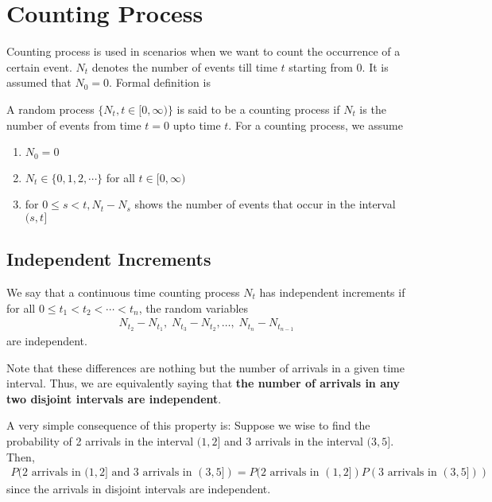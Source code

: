 \documentclass[../../probability-notes.tex]{subfiles}
\begin{document}
    \section{Counting Process}
    Counting process is used in scenarios when we want to count the occurrence of a certain event. $N_{t}$ denotes the number of events till time $t$ starting from 0. It is assumed that $N_{0} = 0$. Formal definition is\newline

    A random process $\{N_{t}, t \in [0, \infty)\}$ is said to be a counting process if $N_{t}$ is the number of events from time $t=0$ upto time $t$. For a counting process, we assume
    \begin{enumerate}
        \item $N_{0} = 0$
        \item $N_{t} \in \{0, 1, 2, \cdots\}$ for all $t \in [0, \infty)$
        \item for $0 \leq s < t, N_{t} - N_{s} $ shows the number of events that occur in the interval $(s,t]$
    \end{enumerate}

    \subsection{Independent Increments}
    We say that a continuous time counting process $N_{t}$ has independent increments if for all $0 \leq t_{1} < t_{2} < \cdots < t_{n}$, the random variables
    \begin{align*}
         N_{t_{2}} - N_{t_{1}}, \;N_{t_{3}} - N_{t_{2}}, \ldots, \;N_{t_{n}} - N_{t_{n-1}}
    \end{align*}
    are independent.\newline

    Note that these differences are nothing but the number of arrivals in a given time interval. Thus, we are equivalently saying that \textbf{the number of arrivals in any two disjoint intervals are independent}.\newline

    A very simple consequence of this property is:\newline
    Suppose we wise to find the probability of 2 arrivals in the interval $(1,2]$ and 3 arrivals in the interval $(3,5]$. Then,
    \begin{align*}
        P(2 \text{ arrivals in } (1,2] \text{ and } 3 \text{ arrivals in } (3,5]) = P(2 \text{ arrivals in } (1,2]) P(3 \text{ arrivals in } (3,5]))
    \end{align*}
    since the arrivals in disjoint intervals are independent.
\end{document}
